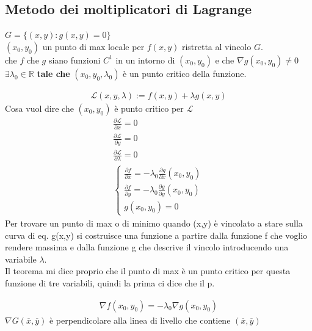 \documentclass[a4paper, oneside]{article}
\begin{document}
        \subsection{Metodo dei moltiplicatori di Lagrange}
        \begin{theorem}
             $G = \{(x,y): g(x,y) = 0\}$\\
             $(x_0,y_0)$ un punto di max locale per $f(x,y)$ ristretta al vincolo $G$.\\
             che  $f$ che $g$ siano funzioni $C^1$ in un intorno di $(x_0,y_0)$ e che $\nabla g(x_0,y_0) \neq 0$\\
             $\exists \lambda_0 \in \mathbb{R}$ \textbf{tale che} $(x_0,y_0,\lambda_0)$ è un punto critico della funzione.
        \end{theorem}
        \begin{gather*}
            \mathcal{L}(x,y,\lambda) := f(x,y) + \lambda g(x,y)
        \end{gather*}
        Cosa vuol dire che $(x_0,y_0)$ è punto critico per $\mathcal{L}$
        \begin{gather*}
            \frac{\partial \mathcal{L}}{\partial x}=0\\
            \frac{\partial \mathcal{L}}{\partial y}=0\\
            \frac{\partial \mathcal{L}}{\partial \lambda}=0\\
            \begin{cases}
                \frac{\partial f}{\partial x} = -\lambda_0 \frac{\partial g}{\partial x}(x_0,y_0)\\
                \frac{\partial f}{\partial y} = -\lambda_0 \frac{\partial g}{\partial y}(x_0,y_0)\\
                g(x_0,y_0) = 0
            \end{cases}
        \end{gather*} 
        Per trovare un punto di max o di minimo quando (x,y) è vincolato a stare sulla curva di eq. g(x,y) si costruisce una funzione a partire dalla funzione f che voglio rendere massima e dalla funzione g che descrive il vincolo introducendo una variabile $\lambda$.\\
        Il teorema mi dice proprio che il punto di max è un punto critico per questa funzione di tre variabili, quindi la prima ci dice che il p.
        \begin{proposition}
            \begin{gather*}
                \nabla f(x_0,y_0) = -\lambda_0 \nabla g(x_0,y_0)
            \end{gather*}
            $\nabla G(\overline{x}, \overline{y}) $ è perpendicolare alla linea di livello che contiene $(\overline{x}, \overline{y})$
        \end{proposition}
\end{document}
